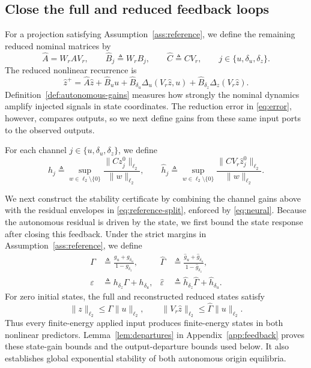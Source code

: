 \documentclass{l4dc2027}
\newcommand{\eqdef}{\triangleq}
\begin{document}
\subsection{Close the full and reduced feedback loops}
For a projection satisfying Assumption~\ref{ass:reference}, we define the remaining reduced nominal matrices by
\begin{equation}\label{eq:reduced-matrices}
 \widehat A=W_rAV_r,\qquad
 \widehat B_j\eqdef W_rB_j,\qquad
 \widehat C\eqdef CV_r,
 \qquad j\in\{u,\delta_u,\delta_z\}.
\end{equation}
The reduced nonlinear recurrence is
\begin{equation}\label{eq:reduced-channels}
 \widehat z^+=\widehat A\widehat z+\widehat B_uu+
 \widehat B_{\delta_u}\Delta_u(V_r\widehat z,u)+
 \widehat B_{\delta_z}\Delta_z(V_r\widehat z).
\end{equation}
Definition~\ref{def:autonomous-gains} measures how strongly the nominal dynamics amplify injected signals in state coordinates.
The reduction error in \eqref{eq:error}, however, compares outputs, so we next define gains from these same input ports to the observed outputs.

\begin{definition}\label{def:gains}
For each channel \mbox{$j\in\{u,\delta_u,\delta_z\}$}, we define
\begin{equation}\label{eq:gains}
 h_j\eqdef\sup_{w\in\ell_2\setminus\{0\}}
 \frac{\|Cz_j^0\|_{\ell_2}}{\|w\|_{\ell_2}},
 \qquad
 \widehat h_j\eqdef\sup_{w\in\ell_2\setminus\{0\}}
 \frac{\|CV_r\widehat z_j^0\|_{\ell_2}}{\|w\|_{\ell_2}}.
\end{equation}
\end{definition}
We next construct the stability certificate by combining the channel gains above with the residual envelopes in \eqref{eq:reference-split}, enforced by \eqref{eq:neural}.
Because the autonomous residual is driven by the state, we first bound the state response after closing this feedback.
Under the strict margins in Assumption~\ref{ass:reference}, we define
\begin{equation}\label{eq:penalties}
 \begin{aligned}
 \Gamma&\eqdef\frac{g_u+g_{\delta_u}}{1-g_{\delta_z}},&
 \widehat\Gamma&\eqdef
 \frac{\widehat g_u+\widehat g_{\delta_u}}
      {1-\widehat g_{\delta_z}},\\
 \varepsilon&\eqdef h_{\delta_z}\Gamma+h_{\delta_u},&
 \widehat\varepsilon&\eqdef
 \widehat h_{\delta_z}\widehat\Gamma+\widehat h_{\delta_u}.
 \end{aligned}
\end{equation}
For zero initial states, the full and reconstructed reduced states satisfy
\[
 \|z\|_{\ell_2}\le\Gamma\|u\|_{\ell_2},
 \qquad
 \|V_r\widehat z\|_{\ell_2}\le\widehat\Gamma\|u\|_{\ell_2}.
\]
Thus every finite-energy applied input produces finite-energy states in both nonlinear predictors.
Lemma~\ref{lem:departures} in Appendix~\ref{app:feedback} proves these state-gain bounds and the output-departure bounds used below.
It also establishes global exponential stability of both autonomous origin equilibria.
\end{document}

